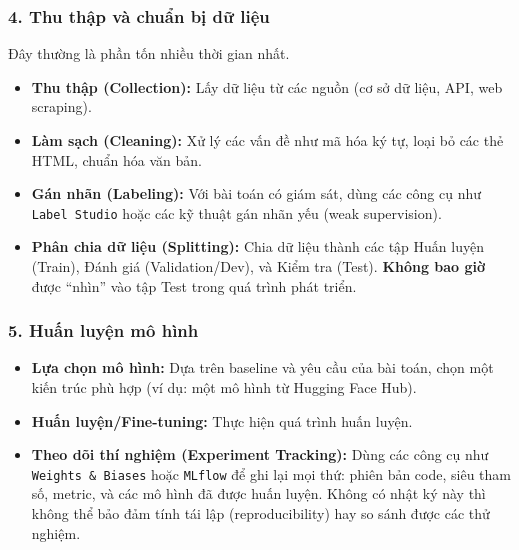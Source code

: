 \subsubsection{4. Thu thập và chuẩn bị dữ liệu}
Đây thường là phần tốn nhiều thời gian nhất.
\begin{itemize}
    \item \textbf{Thu thập (Collection):} Lấy dữ liệu từ các nguồn (cơ sở dữ liệu, API, web scraping).
    \item \textbf{Làm sạch (Cleaning):} Xử lý các vấn đề như mã hóa ký tự, loại bỏ các thẻ HTML, chuẩn hóa văn bản.
    \item \textbf{Gán nhãn (Labeling):} Với bài toán có giám sát, dùng các công cụ như \texttt{Label Studio} hoặc các kỹ thuật gán nhãn yếu (weak supervision).
    \item \textbf{Phân chia dữ liệu (Splitting):} Chia dữ liệu thành các tập Huấn luyện (Train), Đánh giá (Validation/Dev), và Kiểm tra (Test). \textbf{Không bao giờ} được “nhìn” vào tập Test trong quá trình phát triển.
\end{itemize}

\subsubsection{5. Huấn luyện mô hình}
\begin{itemize}
    \item \textbf{Lựa chọn mô hình:} Dựa trên baseline và yêu cầu của bài toán, chọn một kiến trúc phù hợp (ví dụ: một mô hình từ Hugging Face Hub).
    \item \textbf{Huấn luyện/Fine-tuning:} Thực hiện quá trình huấn luyện.
    \item \textbf{Theo dõi thí nghiệm (Experiment Tracking):} Dùng các công cụ như \texttt{Weights \& Biases} hoặc \texttt{MLflow} để ghi lại mọi thứ: phiên bản code, siêu tham số, metric, và các mô hình đã được huấn luyện. Không có nhật ký này thì không thể bảo đảm tính tái lập (reproducibility) hay so sánh được các thử nghiệm.
\end{itemize}

